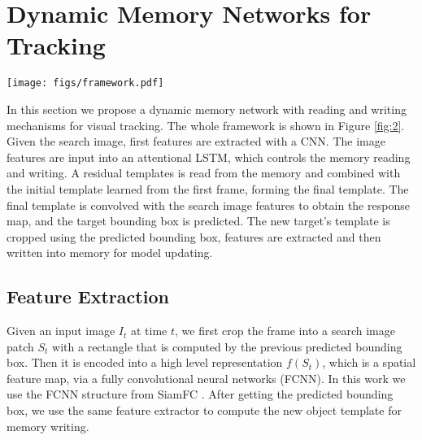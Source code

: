 \documentclass[runningheads]{llncs}
\begin{document}
\section{Dynamic Memory Networks for Tracking}

\begin{figure*}[t]
	\begin{center}
		\texttt{[image: figs/framework.pdf]}
	\end{center}
	\caption{The pipeline of our tracking algorithm. The green rectangle are the candidate region for target searching. The \textit{Feature Extractions} for object image and search image share the same architecture and parameters. An attentional LSTM extracts the target's information on the search feature map, which guides the memory reading process to retrieve a matching template.  The residual  template is combined with the initial template, to obtain a final template for generating the response score. The newly predicted bounding box is then used to crop the object's image patch for memory writing. 
	}
	\label{fig:2}
\end{figure*}

In this section we propose a dynamic memory network with reading and writing mechanisms for visual tracking. 
The whole framework is shown in Figure \ref{fig:2}.
Given the search image, first features are extracted with a CNN.
The image features are input into an attentional LSTM, which controls the memory reading and writing. 
A residual templates is read from the memory and combined with the initial template learned from the first frame, forming the final template.  The final template is convolved with the search image features to obtain the response map, and the target bounding box is predicted.
The new target's template is cropped using the predicted bounding box, features are extracted and then written into memory for model updating. 

\subsection{Feature Extraction}

Given an input image $I_t$ at time $t$, we first crop the frame into a search image patch $S_t$ with a rectangle that is computed by the previous predicted bounding box. Then it is encoded into a high level representation $f(S_t)$, which is a spatial feature map, via a fully convolutional neural networks (FCNN).  In this work we use the FCNN structure from SiamFC \cite{Bertinetto2016}. 
After getting the predicted bounding box, we use the same feature extractor to compute the new object template for memory writing.
\end{document}
